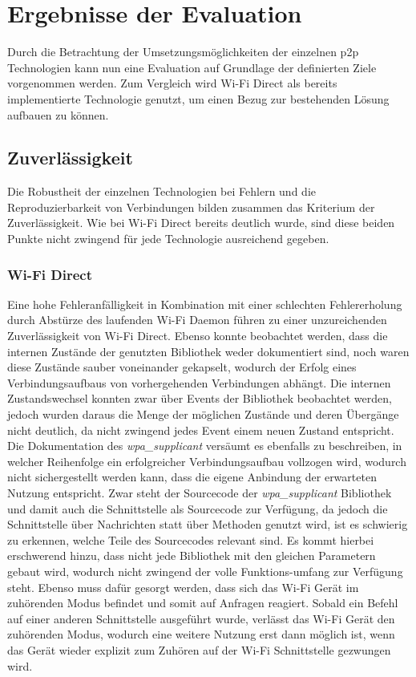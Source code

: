 \section{Ergebnisse der Evaluation}
		Durch die Betrachtung der Umsetzungsmöglichkeiten der einzelnen p2p Technologien kann nun eine Evaluation auf Grundlage der definierten Ziele vorgenommen werden. Zum Vergleich wird Wi-Fi Direct als bereits implementierte Technologie genutzt, um einen Bezug zur bestehenden Lösung aufbauen zu können.
		\subsection{Zuverlässigkeit}
		Die Robustheit der einzelnen Technologien bei Fehlern und die Reproduzierbarkeit von Verbindungen bilden zusammen das Kriterium der Zuverlässigkeit. Wie bei Wi-Fi Direct bereits deutlich wurde, sind diese beiden Punkte nicht zwingend für jede Technologie ausreichend gegeben.
		
		\subsubsection{Wi-Fi Direct} Eine hohe Fehleranfälligkeit in Kombination mit einer schlechten Fehlererholung durch Abstürze des laufenden Wi-Fi Daemon führen zu einer unzureichenden Zuverlässigkeit von Wi-Fi Direct. Ebenso konnte beobachtet werden, dass die internen Zustände der genutzten Bibliothek weder dokumentiert sind, noch waren diese Zustände sauber voneinander gekapselt, wodurch der Erfolg eines Verbindungsaufbaus von vorhergehenden Verbindungen abhängt. Die internen Zustandswechsel konnten zwar über Events der Bibliothek beobachtet werden, jedoch wurden daraus die Menge der möglichen Zustände und deren Übergänge nicht deutlich, da nicht zwingend jedes Event einem neuen Zustand entspricht. Die Dokumentation des {\it wpa\_supplicant} versäumt es ebenfalls zu beschreiben, in welcher Reihenfolge ein erfolgreicher Verbindungsaufbau vollzogen wird, wodurch nicht sichergestellt werden kann, dass die eigene Anbindung der erwarteten Nutzung entspricht.
		Zwar steht der Sourcecode der {\it wpa\_supplicant} Bibliothek und damit auch die Schnittstelle als Sourcecode zur Verfügung, da jedoch die Schnittstelle über Nachrichten statt über Methoden genutzt wird, ist es schwierig zu erkennen, welche Teile des Sourcecodes relevant sind. Es kommt hierbei erschwerend hinzu, dass nicht jede Bibliothek mit den gleichen Parametern gebaut wird, wodurch nicht zwingend der volle Funktions-umfang zur Verfügung steht. Ebenso muss dafür gesorgt werden, dass sich das Wi-Fi Gerät im zuhörenden Modus befindet und somit auf Anfragen reagiert. Sobald ein Befehl auf einer anderen Schnittstelle ausgeführt wurde, verlässt das Wi-Fi Gerät den zuhörenden Modus, wodurch eine weitere Nutzung erst dann möglich ist, wenn das Gerät wieder explizit zum Zuhören auf der Wi-Fi Schnittstelle gezwungen wird.
		
